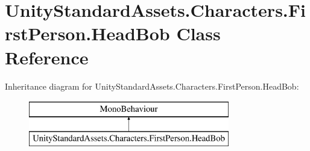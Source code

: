 \hypertarget{class_unity_standard_assets_1_1_characters_1_1_first_person_1_1_head_bob}{}\section{Unity\+Standard\+Assets.\+Characters.\+First\+Person.\+Head\+Bob Class Reference}
\label{class_unity_standard_assets_1_1_characters_1_1_first_person_1_1_head_bob}
Inheritance diagram for Unity\+Standard\+Assets.\+Characters.\+First\+Person.\+Head\+Bob\+:\begin{figure}[H]
\begin{center}
\leavevmode
\includegraphics[height=2.000000cm]{class_unity_standard_assets_1_1_characters_1_1_first_person_1_1_head_bob}
\end{center}
\end{figure}
